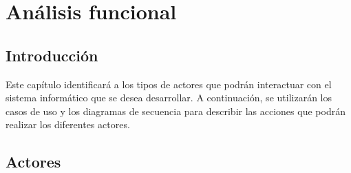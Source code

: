 \chapter{Análisis funcional} \label{cap:analisis}

\section{Introducción}

Este capítulo identificará a los tipos de actores que podrán interactuar con el sistema informático que se desea desarrollar. A continuación, se utilizarán los casos de uso y los diagramas de secuencia para describir las acciones que podrán realizar los diferentes actores.

\section{Actores}

